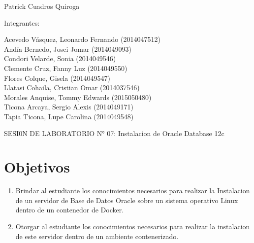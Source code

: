 \documentclass[12pt,letterpaper]{article}
\begin{document}
\begin{titlepage}
\begin{center}
\vspace*{0.1in}
\begin{large}
 Patrick Cuadros Quiroga\\
\end{large}

\vspace*{0.2in}
\vspace*{0.1in}
\begin{large}
Integrantes: \\
\begin{flushleft}
Acevedo Vásquez, Leonardo Fernando 	(2014047512) \\
Andía Bernedo, Josei Jomar 			(2014049093) \\
Condori Velarde, Sonia          	(2014049546) \\
Clemente Cruz, Fanny Luz    		(2014049550) \\
Flores Colque, Gisela           	(2014049547) \\
Llatasi Cohaila, Cristian Omar		(2014037546) \\
Morales Anquise, Tommy Edwards 		(2015050480) \\
Ticona Arcaya, Sergio Alexis		(2014049171) \\
Tapia Ticona, Lupe Carolina			(2014049548) \\
\end{flushleft}
\end{large}
\end{center}

\end{titlepage}




 \tableofcontents
 \newpage
SESI0N DE LABORATORIO N° 07:
Instalacion de Oracle Database 12c

 
\section{Objetivos} 

\begin{enumerate}[1.]
    \item Brindar al estudiante los conocimientos necesarios para realizar la Instalacion de un servidor de Base de Datos
Oracle sobre un sistema operativo Linux dentro de un contenedor de Docker.
    
   \item Otorgar al estudiante los conocimientos necesarios para realizar la instalacion de este servidor dentro de un
ambiente contenerizado.
		\end{enumerate} 
		
\end{document}
